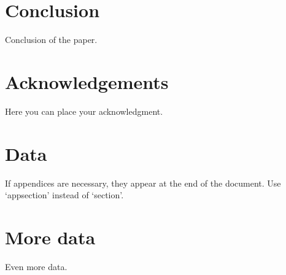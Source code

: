 \documentclass{article}
\begin{document}
\section{Conclusion}
Conclusion of the paper.

\section*{Acknowledgements}
Here you can place your acknowledgment.




\appendix
\newcommand{\appsection}[1]{\let\oldthesection\thesection
  \renewcommand{\thesection}{Appendix \oldthesection:}
  \section{#1}\let\thesection\oldthesection}

\appsection{Data}
If appendices are necessary, they appear at the end of the document. Use `appsection' instead of `section'.
\appsection{More data}
Even more data.
\end{document}
